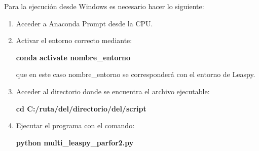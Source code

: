 Para la ejecución desde Windows es necesario hacer lo siguiente:
\begin{enumerate}
	\item Acceder a Anaconda Prompt desde la CPU.
	\item Activar el entorno correcto mediante:
	\begin{center}
		\textbf{conda activate nombre\_entorno}
	\end{center}
	que en este caso nombre\_entorno se corresponderá con el entorno de Leaspy.
	\item Acceder al directorio donde se encuentra el archivo ejecutable:
	\begin{center}
		\textbf{cd C:/ruta/del/directorio/del/script}
	\end{center}
	\item Ejecutar el programa con el comando:
	\begin{center}
		\textbf{python multi\_leaspy\_parfor2.py}
	\end{center}
\end{enumerate}